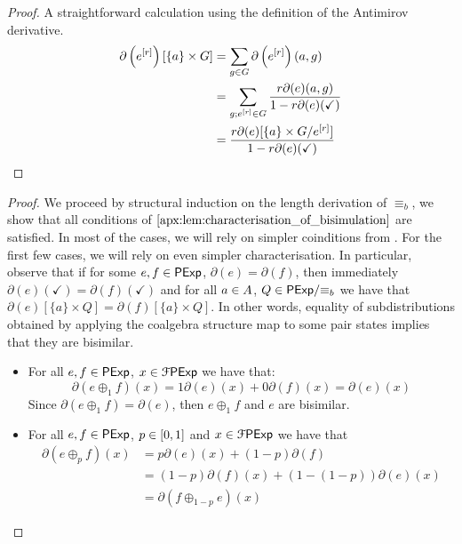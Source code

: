 \begin{proof}
    A straightforward calculation using the definition of the Antimirov derivative.
    \begin{align*}
        \partial\left(e^{[r]}\right)[\{a\} \times G] &= \sum_{g \in G}\partial\left(e^{[r]}\right)(a,g)\\
        &=\sum_{g \mathbin{;} e^{[r]} \in G} \frac{r\partial(e)(a,g)}{1-r\partial(e)(\checkmark)}\\
        &=\frac{r\partial(e)[\{a\} \times {G}/{e^{[r]}}]}{1-r\partial(e)(\checkmark)}\qedhere
    \end{align*}
\end{proof}
\soundnessbisim*
\begin{proof} We proceed by structural induction on the length derivation of $\equiv_b$, we show that all conditions of $\Cref{apx:lem:characterisation_of_bisimulation}$ are satisfied. In most of the cases, we will rely on simpler coinditions from . For the first few cases, we will rely on even simpler characterisation. In particular, observe that if for some $e,f \in \mathsf{PExp}$, $\partial(e) = \partial(f)$, then immediately $\partial(e)(\checkmark)=\partial(f)(\checkmark)$ and for all $a \in {A}$, $Q \in {\mathsf{PExp}}/{\equiv_b}$ we have that $\partial(e)[\{a\}\times Q] = \partial(f)[\{a\}\times Q]$. In other words, equality of subdistributions obtained by applying the coalgebra structure map to some pair states implies that they are bisimilar.
    \begin{itemize}
        \item[] 
        For all $e,f \in \mathsf{PExp}$, $x \in\mathcal{F} \mathsf{PExp} $ we have that: 
        $$
        \partial(e \oplus_1 f)(x) = 1\partial(e)(x) + 0 \partial(f)(x) = \partial(e)(x)
        $$
        Since $\partial(e \oplus_1 f) = \partial(e)$, then $e \oplus_1 f$ and $e$ are bisimilar.

        \item[]  
        For all $e,f  \in \mathsf{PExp}$, $p \in \interval{0}{1}$ and $x \in\mathcal{F} \mathsf{PExp}$ we have that
        \begin{align*}
            \partial(e \oplus_p f)(x) &= p \partial(e)(x) + (1-p) \partial(f)\\
            &= (1-p) \partial(f)(x)  + (1-(1-p))\partial(e)(x)\\ &= \partial(f \oplus_{1-p} e)(x) 
        \end{align*}


\end{itemize}
\end{proof}
